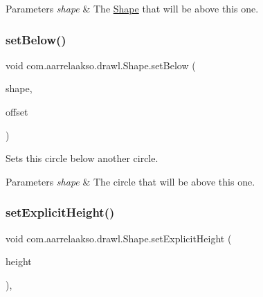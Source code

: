 \begin{DoxyParams}{Parameters}
{\em shape} & The \hyperlink{classcom_1_1aarrelaakso_1_1drawl_1_1_shape}{Shape} that will be above this one. \\
\hline
\end{DoxyParams}
\mbox{\label{classcom_1_1aarrelaakso_1_1drawl_1_1_shape_a9e6a74a094d67337b42a626d8aa167a8}} 
\subsubsection{\texorpdfstring{set\+Below()}{setBelow()}\hspace{0.1cm}{\footnotesize\ttfamily [2/2]}}
{\footnotesize\ttfamily void com.\+aarrelaakso.\+drawl.\+Shape.\+set\+Below (\begin{DoxyParamCaption}\item[{@Not\+Null \hyperlink{classcom_1_1aarrelaakso_1_1drawl_1_1_shape}{Shape}}]{shape,  }\item[{@Not\+Null \hyperlink{classcom_1_1aarrelaakso_1_1drawl_1_1_measure}{Measure}}]{offset }\end{DoxyParamCaption})\hspace{0.3cm}{\ttfamily [inherited]}}



Sets this circle below another circle. 


\begin{DoxyParams}{Parameters}
{\em shape} & The circle that will be above this one. \\
\hline
\end{DoxyParams}
\mbox{\label{classcom_1_1aarrelaakso_1_1drawl_1_1_shape_ad3881ca048d83262948961f9f0ab23e3}} 
\subsubsection{\texorpdfstring{set\+Explicit\+Height()}{setExplicitHeight()}}
{\footnotesize\ttfamily void com.\+aarrelaakso.\+drawl.\+Shape.\+set\+Explicit\+Height (\begin{DoxyParamCaption}\item[{@Nullable \hyperlink{classcom_1_1aarrelaakso_1_1drawl_1_1_drawl_number}{Drawl\+Number}}]{height }\end{DoxyParamCaption})\hspace{0.3cm}{\ttfamily [protected]}, {\ttfamily [inherited]}}



